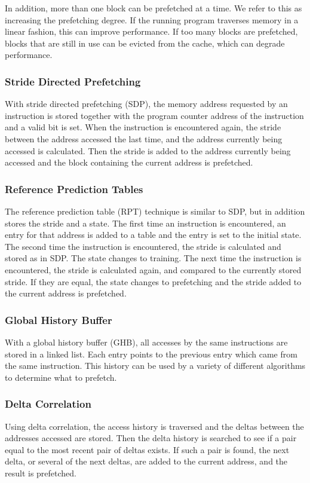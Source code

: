 In addition, more than one block can be prefetched at a time.
We refer to this as increasing the prefetching degree. If the
running program traverses memory in a linear fashion, this can
improve performance. If too many blocks are prefetched, blocks that
are still in use can be evicted from the cache, which can degrade performance.

\subsubsection{Stride Directed Prefetching}

With stride directed prefetching (SDP), the memory address requested by an instruction
is stored together with the program counter address of the instruction
and a valid bit is set. When the instruction is encountered again, the stride
between the address accessed the last time, and the address currently being accessed
is calculated. Then the stride is added to the address currently
being accessed and the block containing the current address is prefetched.

\subsubsection{Reference Prediction Tables}

The reference prediction table (RPT) technique is similar to SDP, but in
addition stores the stride and a state. The first time an
instruction is encountered, an entry for that address is added to a table
and the entry is set to the initial state. The second time the
instruction is encountered, the stride is calculated and stored as in SDP.
The state changes to training. The next time the instruction is
encountered, the stride is calculated again, and compared to the
currently stored stride. If they are equal, the state changes to
prefetching and the stride added to the current address is
prefetched.

\subsubsection{Global History Buffer}

With a global history buffer (GHB), all accesses by the same
instructions are stored in a linked list. Each entry points to
the previous entry which came from the same instruction. This
history can be used by a variety of different algorithms to
determine what to prefetch.

\subsubsection{Delta Correlation}

Using delta correlation, the access history is traversed and the
deltas between the addresses accessed are stored. Then the delta
history is searched to see if a pair equal to the most recent pair
of deltas exists. If such a pair is found, the next delta, or
several of the next deltas, are added to the current address,
and the result is prefetched.
